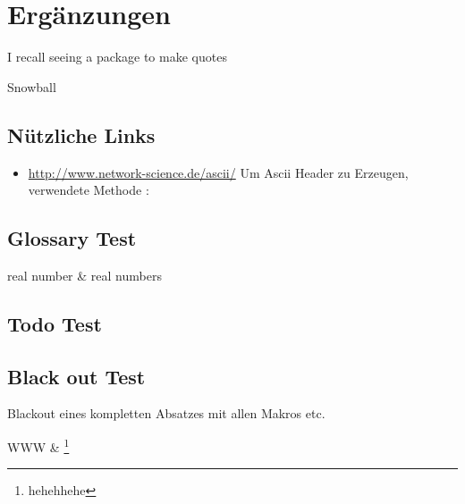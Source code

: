 %

\chapter{Ergänzungen}
	\epigraph{I recall seeing a package to make quotes}{Snowball}
	\section{Nützliche Links}
	\begin{itemize}
		\item \url{http://www.network-science.de/ascii/} Um Ascii Header zu Erzeugen, verwendete Methode : 
	\end{itemize}
	
	\section{Glossary Test}
	\gls{real number} \& \glspl{real number}
	
	\section{Todo Test}
	\lipsum[11]
	\lipsum[11]
	\lipsum[11]
	\lipsum[11]
	\lipsum[11]
	\lipsum[11]
	
	\section{Black out Test}
	Blackout eines kompletten Absatzes mit allen Makros etc. \\
	\begin{censorenv}
		\ac{WWW} \& \cite{dante.2010a} \footnote{hehehhehe}
	\end{censorenv}
	
